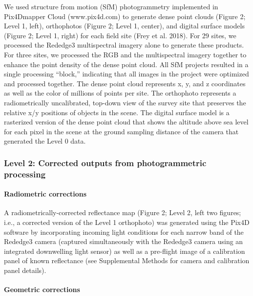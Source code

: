 \documentclass[]{article}
\let\oldparagraph\paragraph
\renewcommand{\paragraph}[1]{\oldparagraph{#1}\mbox{}}
\begin{document}
We used structure from motion (SfM) photogrammetry implemented in
Pix4Dmapper Cloud (www.pix4d.com) to generate dense point clouds (Figure
2; Level 1, left), orthophotos (Figure 2; Level 1, center), and digital
surface models (Figure 2; Level 1, right) for each field site (Frey et
al. 2018). For 29 sites, we processed the Rededge3 multispectral imagery
alone to generate these products. For three sites, we processed the RGB
and the multispectral imagery together to enhance the point density of
the dense point cloud. All SfM projects resulted in a single processing
``block,'' indicating that all images in the project were optimized and
processed together. The dense point cloud represents x, y, and z
coordinates as well as the color of millions of points per site. The
orthophoto represents a radiometrically uncalibrated, top-down view of
the survey site that preserves the relative x/y positions of objects in
the scene. The digital surface model is a rasterized version of the
dense point cloud that shows the altitude above sea level for each pixel
in the scene at the ground sampling distance of the camera that
generated the Level 0 data.

\hypertarget{level-2-corrected-outputs-from-photogrammetric-processing}{%
\subsubsection{Level 2: Corrected outputs from photogrammetric
processing}\label{level-2-corrected-outputs-from-photogrammetric-processing}}

\hypertarget{radiometric-corrections}{%
\paragraph{Radiometric corrections}\label{radiometric-corrections}}

A radiometrically-corrected reflectance map (Figure 2; Level 2, left two
figures; i.e., a corrected version of the Level 1 orthophoto) was
generated using the Pix4D software by incorporating incoming light
conditions for each narrow band of the Rededge3 camera (captured
simultaneously with the Rededge3 camera using an integrated downwelling
light sensor) as well as a pre-flight image of a calibration panel of
known reflectance (see Supplemental Methods for camera and calibration
panel details).

\hypertarget{geometric-corrections}{%
\paragraph{Geometric corrections}\label{geometric-corrections}}
\end{document}
